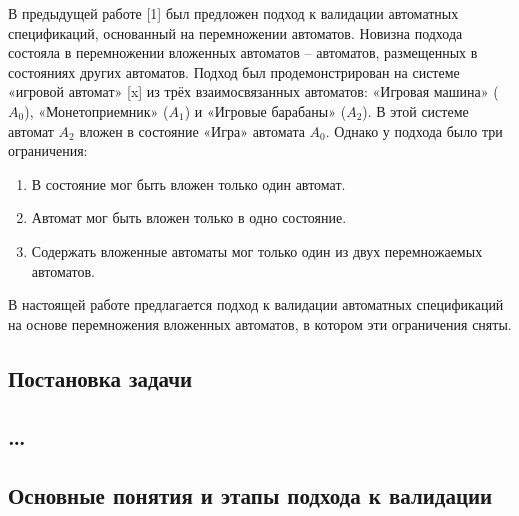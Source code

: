 \documentclass[12pt]{article}
\begin{document}
В предыдущей работе [1] был предложен подход к валидации автоматных спецификаций, основанный на перемножении автоматов. Новизна подхода состояла в перемножении вложенных автоматов – автоматов, размещенных в состояниях других автоматов. Подход был продемонстрирован на системе «игровой автомат» [x] из трёх взаимосвязанных автоматов: «Игровая машина» ($A_{0}$), «Монетоприемник» ($A_{1}$) и «Игровые барабаны» ($A_{2}$). В этой системе автомат $A_{2}$ вложен в состояние «Игра» автомата $A_{0}$. Однако у подхода было три ограничения:

\begin{enumerate}
\item В состояние мог быть вложен только один автомат.
\item Автомат мог быть вложен только в одно состояние.
\item Содержать вложенные автоматы мог только один из двух перемножаемых автоматов.
\end{enumerate}

В настоящей работе предлагается подход к валидации автоматных спецификаций на основе перемножения вложенных автоматов, в котором эти ограничения сняты.

\subsection*{Постановка задачи}

\subsection*{…}

\subsection*{Основные понятия и этапы подхода к валидации}
\end{document}
